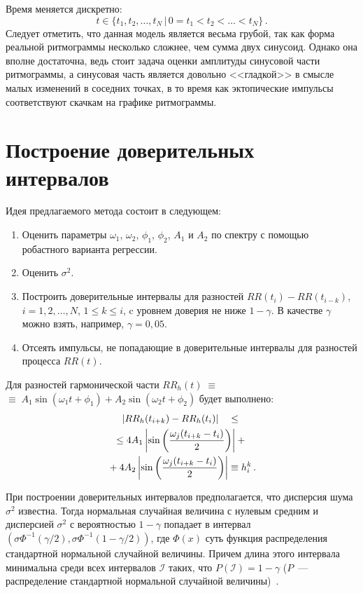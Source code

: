 \begin{multicols}{2}
 Время меняется дискретно: 
 $$
 t \in \{t_1,t_2,\ldots,
t_N\,|\,0=t_1<t_2<\ldots<t_N \}\,.
$$ 
Следует отметить, что данная
модель является весьма грубой, так как форма реальной ритмограммы
несколько сложнее, чем сумма двух синусоид. Однако она вполне
достаточна, ведь стоит задача оценки амплитуды синусовой части
ритмограммы, а синусовая часть является довольно <<гладкой>> в
смысле малых изменений в соседних точках, в то время как
эктопические импульсы соответствуют скачкам на графике
ритмограммы.

\section{Построение доверительных интервалов}%

Идея предлагаемого метода состоит в сле\-ду\-ющем:
\begin{enumerate}[1.]
    \item Оценить параметры $\omega_1$, $\omega_2$, $\phi_1$, $\phi_2$, $A_1$ и $A_2$ по спектру с помощью робастного варианта регрессии.
    \item Оценить $\sigma^2$.\\[-14pt]
    \item Построить доверительные интервалы для разностей $RR(t_i)-RR(t_{i-k})$, 
    $i=1,2,\ldots,N$, $1\leq k\leq i$, c уровнем доверия не ниже $1-\gamma$. 
    В качестве $\gamma$ можно взять, например, $\gamma=0{,}05$.\\[-14pt]
    \item Отсеять импульсы, не попадающие в доверительные интервалы для разностей процесса $RR(t)$.\\[-14pt]
\end{enumerate}

Для разностей гармонической части 
$RR_h(t)\;\equiv$\linebreak $\equiv\;A_1\sin(\omega_1 t + \phi_1) + A_2\sin(\omega_2 t + \phi_2)$ будет выполнено:
\begin{multline}
\label{harmonicdiff}
   \left|RR_h(t_{i+k}) - RR_h(t_i)\right|\quad \leq {}\\
   \leq 4A_1\left|\sin\left(\displaystyle\frac{\displaystyle \omega_j (t_{i+k}-t_i)\mathstrut}{\displaystyle 2\mathstrut}\right)\right| + {}\\
   {}+4A_2\left|\sin\left(\displaystyle\frac{\displaystyle \omega_j (t_{i+k}-t_i)\mathstrut}{\displaystyle 2\mathstrut}\right)\right| \equiv h_i^k\,.
\end{multline}

При построении доверительных интервалов предполагается, что
дисперсия шума $\sigma^2$ известна. Тогда нормальная случайная
величина с нулевым средним и дисперсией $\sigma^2$ с вероятностью
$1-\gamma$ попадает в интервал
$\left(\sigma\Phi^{-1}\left(\gamma/2\right),
\sigma\Phi^{-1}\left(1-\gamma/2\right)\right)$, где
$\Phi(x)$ суть функция распределения стандартной нормальной
случайной величины. Причем длина этого интервала минимальна среди
всех интервалов $\mathcal{I}$ таких, что $P(\mathcal{I}) =
1-\gamma$ ($P$~--- распределение стандартной нормальной случайной
величины)~\cite{4ma}.


\end{multicols}
